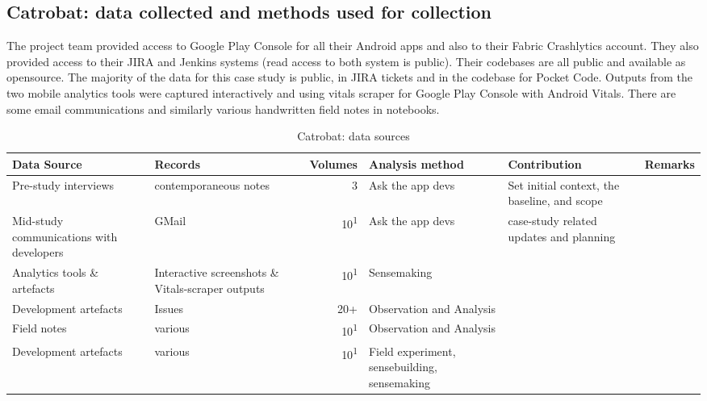 \subsection{Catrobat: data collected and methods used for collection}
The project team provided access to Google Play Console for all their Android apps and also to their Fabric Crashlytics account. They also provided access to their JIRA and Jenkins systems (read access to both system is public). Their codebases are all public and available as opensource. The majority of the data for this case study is public, in JIRA tickets and in the codebase for Pocket Code. Outputs from the two mobile analytics tools were captured interactively and using vitals scraper for Google Play Console with Android Vitals. There are some email communications and similarly various handwritten field notes in notebooks.


\begin{table*}
    \centering
    \footnotesize
    \tabcolsep=0.12cm
    \begin{tabular}{p{2.4cm}p{2.4cm}r>{\raggedright}p{2.4cm}>{\raggedright}p{3cm}>{\raggedright\arraybackslash}p{2.5cm}}
        Data Source & Records & Volumes & Analysis method & Contribution & Remarks \\
        \toprule
         Pre-study interviews & contemporaneous notes\footnotemark & 3 & Ask the app devs & Set initial context, the baseline, and scope &  \\
         Mid-study communications with developers & GMail & 10\textsuperscript{1} & Ask the app devs & case-study related updates and planning &  \\
         Analytics tools \& artefacts & Interactive screenshots \& Vitals-scraper outputs &10\textsuperscript{1} & Sensemaking &  &  \\
         Development artefacts & Issues & 20+ & Observation and Analysis & & \\
         Field notes & various & 10\textsuperscript{1} & Observation and Analysis & & \\
         Development artefacts & various\footnotemark & 10\textsuperscript{1} & Field experiment, sensebuilding, sensemaking & & \\
         \bottomrule
    \end{tabular}
    \caption{Catrobat: data sources}
    \label{tab:catrobat-data-sources}
\end{table*}


